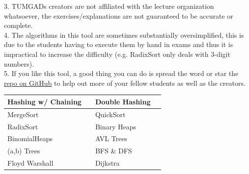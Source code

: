 \documentclass[12pt]{article}
\begin{document}
    3. TUMGADs creators are not affiliated with the lecture organization whatsoever, the exercises/explanations are not
    guaranteed to be accurate or complete.
    \\[0.2in]
    4. The algorithms in this tool are sometimes substantially oversimplified, this is due to the students having to execute them by hand in exams
    and thus it is impractical to increase the difficulty (e.g. RadixSort only deals with 3-digit numbers).
    \\[0.2in]
    5. If you like this tool, a good thing you can do is spread the word or star the \href{https://github.com/ossner/TUMGAD/}{\underline{repo on GitHub}} to help out more of your fellow students as well as the creators.
    \vspace{20px}
    \begin{center}
        \begin{tabular}{|P{4cm}|P{1cm}||P{4cm}|P{1cm}|}
            \hline
            Hashing w/ Chaining & %
            & Double Hashing & %
            \\ \hline
            MergeSort & %
            & QuickSort & %
            \\ \hline
            RadixSort & %
            & Binary Heaps & %
            \\ \hline
            BinomialHeaps & %
            & AVL Trees & %
            \\ \hline
            (a,b) Trees & %
            & BFS \& DFS & %
            \\ \hline
            Floyd Warshall & %
            & Dijkstra & %
            \\ \hline
        \end{tabular}
    \end{center}
\end{document}
